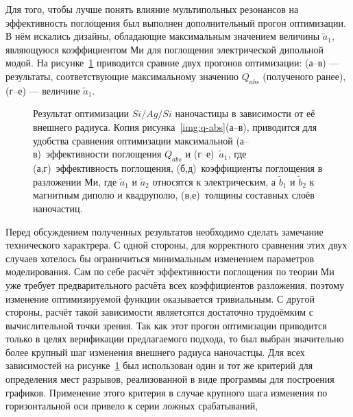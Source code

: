 Для того, чтобы лучше понять влияние мультипольных резонансов на
эффективность поглощения был выполнен дополнительный прогон
оптимизации. В нём искались дизайны, обладающие максимальным значением
величины $\tilde{a}_1$, являющуюся коэффициентом Ми для поглощения
электрической дипольной модой. На рисунке~\ref{img:q-abs-a1}
приводится сравние двух прогонов оптимизации: (а--в) --- результаты,
соответствующие максимальному значению $Q_{abs}$ (полученого ранее),
(г--е) --- величине $\tilde{a}_1$.
\begin{figure}[t]
  \begin{minipage}[ht]{0.495\linewidth}
  \end{minipage}
  \hfill
  \begin{minipage}[ht]{0.495\linewidth}
  \end{minipage}
  \caption{ Результат оптимизации $Si/Ag/Si$ наночастицы в
    зависимости от её внешнего радиуса.  Копия
    рисунка~\ref{img:q-abs}(а--в), приводится для удобства сравнения
    оптимизации максимальной (а--в)~эффективности поглощения $Q_{abs}$
    и (г--е)~$\tilde{a}_1$, где (а,г)~эффективность
    поглощения, (б,д)~коэффициенты поглощения в разложении Ми, где
    $\tilde{a}_1$ и $\tilde{a}_2$ относятся к электрическим, а
    $\tilde{b}_1$ и $\tilde{b}_2$ к магнитным диполю и квадруполю,
    (в,е)~толщины составных слоёв наночастиц.}
  \label{img:q-abs-a1}
\end{figure}
Перед обсуждением полученных результатов необходимо сделать замечание
технического характрера.  С одной стороны, для корректного сравнения
этих двух случаев хотелось бы ограничиться минимальным изменением
параметров моделирования.  Сам по себе расчёт эффективности поглощения
по теории Ми уже требует предварительного расчёта всех коэффициентов
разложения, поэтому изменение оптимизируемой функции оказывается
тривиальным.  С другой стороны, расчёт такой зависимости являетсятся
достаточно трудоёмким с вычислительной точки зрения.  Так как этот
прогон оптимизации приводится только в целях верификации предлагаемого
подхода, то был выбран значительно более крупный шаг изменения
внешнего радиуса наночастцы.  Для всех зависимостей на
рисунке~\ref{img:q-abs-a1} был использован один и тот же критерий для
определения мест разрывов, реализованной в виде программы для
построения графиков.  Применение этого критерия в случае крупного шага
изменения по горизонтальной оси привело к серии ложных срабатываний,
